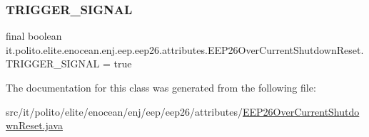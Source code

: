 \subsubsection{\texorpdfstring{T\+R\+I\+G\+G\+E\+R\+\_\+\+S\+I\+G\+N\+AL}{TRIGGER\_SIGNAL}}
{\footnotesize\ttfamily final boolean it.\+polito.\+elite.\+enocean.\+enj.\+eep.\+eep26.\+attributes.\+E\+E\+P26\+Over\+Current\+Shutdown\+Reset.\+T\+R\+I\+G\+G\+E\+R\+\_\+\+S\+I\+G\+N\+AL = true\hspace{0.3cm}{\ttfamily [static]}}



The documentation for this class was generated from the following file\+:\begin{DoxyCompactItemize}
\item 
src/it/polito/elite/enocean/enj/eep/eep26/attributes/\hyperlink{_e_e_p26_over_current_shutdown_reset_8java}{E\+E\+P26\+Over\+Current\+Shutdown\+Reset.\+java}\end{DoxyCompactItemize}
